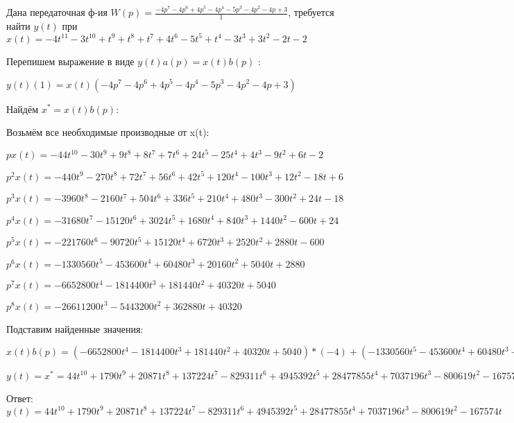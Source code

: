\documentclass{article}
\begin{document}
{{{Дана передаточная ф-ия $W(p)=\frac{-4p^{7}-4p^{6}+4p^{5}-4p^{4}-5p^{3}-4p^{2}-4p+3}{1}$, требуется найти $y(t)$ при $x(t)=-4t^{11}-3t^{10}+t^{9}+t^{8}+t^{7}+4t^{6}-5t^{5}+t^{4}-3t^{3}+3t^{2}-2t-2$

Перепишем выражение в виде $y(t)a(p)=x(t)b(p)$ :

$y(t)(1)=x(t)(-4p^{7}-4p^{6}+4p^{5}-4p^{4}-5p^{3}-4p^{2}-4p+3)$

Найдём $x^*=x(t)b(p)$:

Возьмём все необходимые производные от x(t):

$px(t)=-44t^{10}-30t^{9}+9t^{8}+8t^{7}+7t^{6}+24t^{5}-25t^{4}+4t^{3}-9t^{2}+6t-2$

$p^2x(t)=-440t^{9}-270t^{8}+72t^{7}+56t^{6}+42t^{5}+120t^{4}-100t^{3}+12t^{2}-18t+6$

$p^3x(t)=-3960t^{8}-2160t^{7}+504t^{6}+336t^{5}+210t^{4}+480t^{3}-300t^{2}+24t-18$

$p^4x(t)=-31680t^{7}-15120t^{6}+3024t^{5}+1680t^{4}+840t^{3}+1440t^{2}-600t+24$

$p^5x(t)=-221760t^{6}-90720t^{5}+15120t^{4}+6720t^{3}+2520t^{2}+2880t-600$

$p^6x(t)=-1330560t^{5}-453600t^{4}+60480t^{3}+20160t^{2}+5040t+2880$

$p^7x(t)=-6652800t^{4}-1814400t^{3}+181440t^{2}+40320t+5040$

$p^8x(t)=-26611200t^{3}-5443200t^{2}+362880t+40320$

Подставим найденные значения:

$x(t)b(p) = (-6652800t^{4}-1814400t^{3}+181440t^{2}+40320t+5040)*(-4)+(-1330560t^{5}-453600t^{4}+60480t^{3}+20160t^{2}+5040t+2880)*(-4)+(-221760t^{6}-90720t^{5}+15120t^{4}+6720t^{3}+2520t^{2}+2880t-600)*4+(-31680t^{7}-15120t^{6}+3024t^{5}+1680t^{4}+840t^{3}+1440t^{2}-600t+24)*(-4)+(-3960t^{8}-2160t^{7}+504t^{6}+336t^{5}+210t^{4}+480t^{3}-300t^{2}+24t-18)*(-5)+(-440t^{9}-270t^{8}+72t^{7}+56t^{6}+42t^{5}+120t^{4}-100t^{3}+12t^{2}-18t+6)*(-4)+(-44t^{10}-30t^{9}+9t^{8}+8t^{7}+7t^{6}+24t^{5}-25t^{4}+4t^{3}-9t^{2}+6t-2)*(-4)+(-44t^{10}-30t^{9}+9t^{8}+8t^{7}+7t^{6}+24t^{5}-25t^{4}+4t^{3}-9t^{2}+6t-2)*3=44t^{10}+1790t^{9}+20871t^{8}+137224t^{7}-829311t^{6}+4945392t^{5}+28477855t^{4}+7037196t^{3}-800619t^{2}-167574t$





$y(t)=x^*=44t^{10}+1790t^{9}+20871t^{8}+137224t^{7}-829311t^{6}+4945392t^{5}+28477855t^{4}+7037196t^{3}-800619t^{2}-167574t$

Ответ: $y(t) = 44t^{10}+1790t^{9}+20871t^{8}+137224t^{7}-829311t^{6}+4945392t^{5}+28477855t^{4}+7037196t^{3}-800619t^{2}-167574t$

}}}
\end{document}
